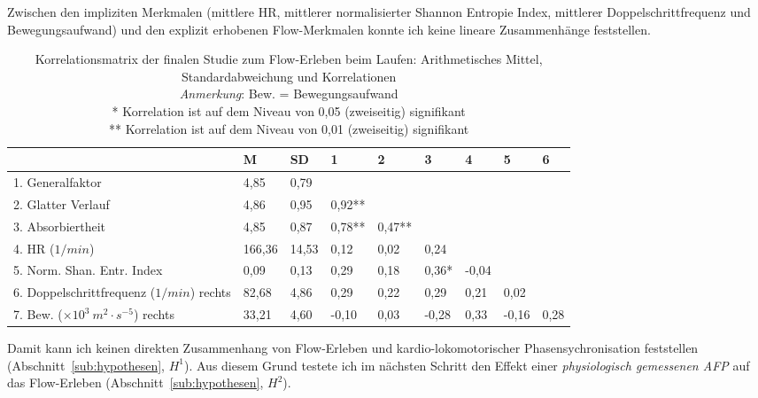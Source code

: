 Zwischen den impliziten Merkmalen (mittlere \ac{HR}, mittlerer normalisierter Shannon Entropie Index, mittlerer Doppelschrittfrequenz und Bewegungsaufwand) und den explizit erhobenen Flow-Merkmalen konnte ich keine lineare Zusammenhänge feststellen.

\begin{sidewaystable}
\centering
	\caption[Korrelationsmatrix (Finale Studie: Laufen)]{Korrelationsmatrix der finalen Studie zum Flow-Erleben beim Laufen: Arithmetisches Mittel, Standardabweichung und Korrelationen \\ \hspace{\textwidth}\emph{Anmerkung}: Bew. = Bewegungsaufwand \\ \hspace{\textwidth}* Korrelation ist auf dem Niveau von 0,05 (zweiseitig) signifikant \\ \hspace{\textwidth}** Korrelation ist auf dem Niveau von 0,01 (zweiseitig) signifikant}
	\label{tab:korrelationen_3}
\begin{tabular}{lxxxxxxxx}
  \toprule
 & M & SD & 1 & 2 & 3 & 4 & 5 & 6 \\ 
  . Generalfaktor & 4,85 & 0,79 &   &   &   &   &   &   \\ 
  2. Glatter Verlauf & 4,86 & 0,95 & 0,92** &   &   &   &   &   \\ 
  3. Absorbiertheit & 4,85 & 0,87 & 0,78** & 0,47** &   &   &   &   \\ 
  4. HR ($1/min$) & 166,36 & 14,53 & 0,12 & 0,02 & 0,24 &   &   &   \\ 
  5. Norm. Shan. Entr. Index & 0,09 & 0,13 & 0,29 & 0,18 & 0,36* & -0,04 &   &   \\ 
  6. Doppelschrittfrequenz ($1/min$) rechts & 82,68 & 4,86 & 0,29 & 0,22 & 0,29 & 0,21 & 0,02 &   \\ 
  7. Bew. ($\times 10^3 \: m^2 \cdot s^{-5}$) rechts & 33,21 & 4,60 & -0,10 & 0,03 & -0,28 & 0,33 & -0,16 & 0,28 \\ 
   \bottomrule
\end{tabular}
\end{sidewaystable}

Damit kann ich keinen direkten Zusammenhang von Flow-Erleben und kardio-lokomotorischer Phasensychronisation feststellen (Abschnitt~\ref{sub:hypothesen}, $H^1$). Aus diesem Grund testete ich im nächsten Schritt den Effekt einer \emph{physiologisch gemessenen \ac{AFP}} auf das Flow-Erleben (Abschnitt~\ref{sub:hypothesen}, $H^2$).

